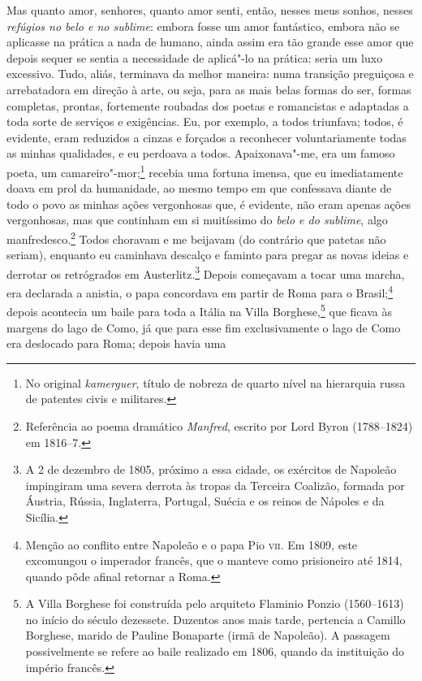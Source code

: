 Mas quanto amor, senhores, quanto amor senti, então, nesses meus sonhos,
nesses \textit{refúgios no belo e no sublime}: embora fosse um amor
fantástico, embora não se aplicasse na prática a nada de humano, ainda
assim era tão grande esse amor que depois sequer se sentia a
necessidade de aplicá"-lo na prática: seria um luxo excessivo. Tudo,
aliás, terminava da melhor maneira: numa transição preguiçosa e
arrebatadora em direção à arte, ou seja, para as mais belas formas do
ser, formas completas, prontas, fortemente roubadas dos poetas e
romancistas e adaptadas a toda sorte de serviços e exigências. Eu, por
exemplo, a todos triunfava; todos, é evidente, eram reduzidos a cinzas
e forçados a reconhecer voluntariamente todas as minhas qualidades, e
eu perdoava a todos. Apaixonava"-me, era um famoso poeta, um
camareiro"-mor;\footnote{ No original \textit{kamerguer}, título de
nobreza de quarto nível na hierarquia russa de patentes civis e militares.}
recebia uma fortuna imensa, que eu imediatamente doava em prol da
humanidade, ao mesmo tempo em que confessava diante de todo o povo as
minhas ações vergonhosas que, é evidente, não eram apenas ações
vergonhosas, mas que continham em si muitíssimo do \textit{belo e do sublime},
algo manfredesco.\footnote{ Referência ao poema dramático
\textit{Manfred}, escrito por Lord Byron (1788--1824) em 1816--7.} Todos
choravam e me beijavam (do contrário que patetas não seriam), enquanto
eu caminhava descalço e faminto para pregar as novas ideias e derrotar
os retrógrados em Austerlitz.\footnote{ A 2 de dezembro de 1805,
próximo a essa cidade, os exércitos de Napoleão impingiram uma
severa derrota às tropas da Terceira Coalizão, formada por Áustria,
Rússia, Inglaterra, Portugal, Suécia e os reinos de Nápoles e da
Sicília.} Depois começavam a tocar uma marcha, era declarada a anistia,
o papa concordava em partir de Roma para o Brasil;\footnote{ Menção ao
conflito entre Napoleão e o papa Pio \textsc{vii}. Em 1809, este excomungou o
imperador francês, que o manteve como prisioneiro até 1814, quando pôde
afinal retornar a Roma.} depois acontecia um baile para toda a Itália
na Villa Borghese,\footnote{ A Villa Borghese foi construída pelo
arquiteto Flaminio Ponzio (1560--1613) no início do século dezessete.
Duzentos anos mais tarde, pertencia a Camillo Borghese, marido de
Pauline Bonaparte (irmã de Napoleão). A passagem possivelmente se
refere ao baile realizado em 1806, quando da instituição do império
francês.} que ficava às margens do lago de Como, já que para esse fim
exclusivamente o lago de Como era deslocado para Roma; depois havia uma
